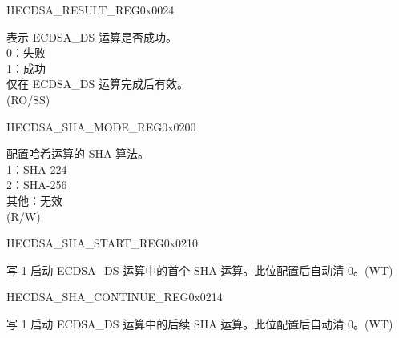 \begin{register}{H}{ECDSA\_RESULT\_REG}{0x0024}\label{regdesc:ECDSARESULTREG}
%
%
\regnewline%
\begin{regdesc}\begin{reglist}
\label{fielddesc:ECDSAOPERATIONRESULT}\item [ECDSA\_OPERATION\_RESULT] 表示 ECDSA\_DS 运算是否成功。\\
0：失败\\
1：成功\\
仅在 ECDSA\_DS 运算完成后有效。\\
(RO/SS)
\end{reglist}\end{regdesc}
\end{register}

\begin{register}{H}{ECDSA\_SHA\_MODE\_REG}{0x0200}\label{regdesc:ECDSASHAMODEREG}
%
%
\regnewline%
\begin{regdesc}\begin{reglist}
\label{fielddesc:ECDSASHAMODE}\item [ECDSA\_SHA\_MODE] 配置哈希运算的 SHA 算法。\\
1：SHA-224\\
2：SHA-256\\
其他：无效\\
(R/W)
\end{reglist}\end{regdesc}
\end{register}


\begin{register}{H}{ECDSA\_SHA\_START\_REG}{0x0210}\label{regdesc:ECDSASHASTARTREG}
%
%
\regnewline%
\begin{regdesc}\begin{reglist}
\label{fielddesc:ECDSASHASTART}\item [ECDSA\_SHA\_START] 写 1 启动 ECDSA\_DS 运算中的首个 SHA 运算。此位配置后自动清 0。(WT)
\end{reglist}\end{regdesc}
\end{register}


\begin{register}{H}{ECDSA\_SHA\_CONTINUE\_REG}{0x0214}\label{regdesc:ECDSASHACONTINUEREG}
%
%
\regnewline%
\begin{regdesc}\begin{reglist}
\label{fielddesc:ECDSASHACONTINUE}\item [ECDSA\_SHA\_CONTINUE] 写 1 启动 ECDSA\_DS 运算中的后续 SHA 运算。此位配置后自动清 0。(WT)
\end{reglist}\end{regdesc}
\end{register}


